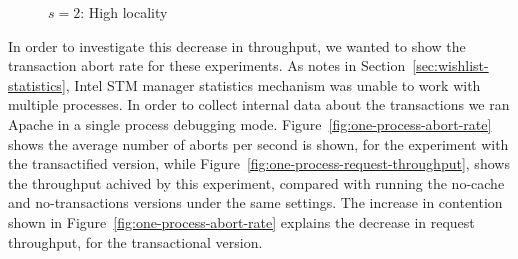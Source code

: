 \documentclass[preprint,11pt]{sigplanconf}
\begin{document}
\begin{figure}
 \centering
 \hfill
 \caption{$s = 2$: High locality}
\end{figure}

In order to investigate this decrease in throughput, we wanted to show the
transaction abort rate for these experiments. As notes in
Section~\ref{sec:wishlist-statistics}, Intel STM manager statistics mechanism
was unable to work with multiple processes. In order to collect
internal data about the transactions we ran Apache in a single process debugging
mode. Figure~\ref{fig:one-process-abort-rate} shows the average number of aborts
per second is shown, for the experiment with the transactified version, while
Figure~\ref{fig:one-process-request-throughput}, shows the throughput achived by
this experiment, compared with running the no-cache and no-transactions versions
under the same settings. The increase in contention shown in
Figure~\ref{fig:one-process-abort-rate} explains the decrease in request
throughput, for the transactional version.
\end{document}
